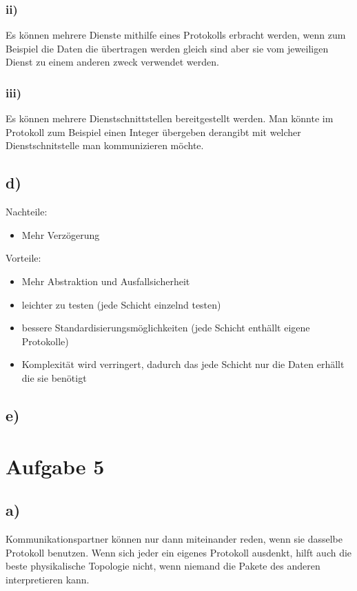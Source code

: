 \documentclass[a4paper,12pt]{scrartcl}
\begin{document}
\subsubsection{ii)}
Es können mehrere Dienste mithilfe eines Protokolls erbracht werden, wenn zum Beispiel die Daten die übertragen werden gleich sind
aber sie vom jeweiligen Dienst zu einem anderen zweck verwendet werden.

\subsubsection{iii)}
Es können mehrere Dienstschnittstellen bereitgestellt werden. Man könnte im Protokoll zum Beispiel einen Integer übergeben derangibt mit welcher Dienstschnitstelle man kommunizieren möchte.

\subsection{d)}
Nachteile:
\begin{itemize}
	\item Mehr Verzögerung
\end{itemize}
Vorteile:
\begin{itemize}
	\item Mehr Abstraktion und Ausfallsicherheit
	\item leichter zu testen (jede Schicht einzelnd testen)
	\item  bessere Standardisierungsmöglichkeiten (jede Schicht enthällt eigene Protokolle)
	\item Komplexität wird verringert, dadurch das jede Schicht nur die Daten erhällt die sie benötigt
\end{itemize}

\subsection{e)}

\section{Aufgabe 5}
\subsection{a)}
Kommunikationspartner können nur dann miteinander reden, wenn sie dasselbe
Protokoll benutzen. Wenn sich jeder ein eigenes Protokoll ausdenkt, hilft
auch die beste physikalische Topologie nicht, wenn niemand die Pakete des
anderen interpretieren kann.
\end{document}
